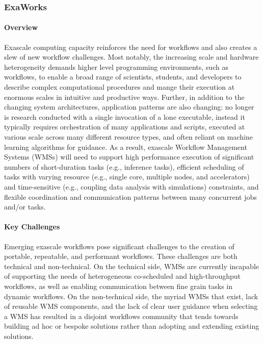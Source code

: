 
\subsubsection{ ExaWorks} \label{subsubsect:exaworks}


\paragraph{Overview} Exascale computing capacity reinforces the need for workflows and also creates
a slew of new workflow challenges. Most notably, the increasing scale and
hardware heterogeneity demands higher level programming environments, such as
workflows, to enable a broad range of scientists, students, and developers to
describe complex computational procedures and mange their execution at
enormous scales in intuitive and productive ways. Further, in addition to the
changing system architectures, application patterns are also changing: no
longer is research conducted with a single invocation of a lone executable,
instead it typically requires orchestration of many applications and scripts,
executed at various scale across many different resource types, and often
reliant on machine learning algorithms for guidance. As a result, exascale
Workflow Management Systems (WMSs) will need to support high performance
execution of significant numbers of short-duration tasks (e.g., inference
tasks), efficient scheduling of tasks with varying resource (e.g., single
core, multiple nodes, and accelerators) and time-sensitive (e.g., coupling
data analysis with simulations) constraints, and flexible coordination and
communication patterns between many concurrent jobs and/or tasks.


\paragraph{Key Challenges}
Emerging exascale workflows pose significant challenges to the creation of
portable, repeatable, and performant workflows. These challenges are both
technical and non-technical. On the technical side, WMSs are currently
incapable of supporting the needs of heterogeneous co-scheduled and
high-throughput workflows, as well as enabling communication between fine
grain tasks in dynamic workflows. On the non-technical side, the myriad WMSs
that exist, lack of reusable WMS components, and the lack of clear user
guidance when selecting a WMS has resulted in a disjoint workflows community
that tends towards building ad hoc or bespoke solutions rather than adopting
and extending existing solutions.

